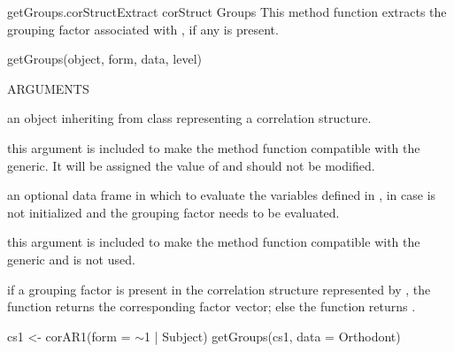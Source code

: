 \documentclass[pdftex]{article} \usepackage{url,graphicx}
\renewcommand{\Twiddle}{\mbox{\(\sim\)}}
\begin{document}
\begin{Helpfile}{getGroups.corStruct}{Extract corStruct Groups}
This method function extracts the grouping factor associated with
, if any is present.
\begin{Example}
getGroups(object, form, data, level)
\end{Example}
\begin{Argument}{ARGUMENTS}
\item[\Co{object:}]
an object inheriting from class 
representing a correlation structure.
\item[\Co{form:}]
this argument is included to make the method function
compatible with the generic. It will be assigned the value of
 and should not be modified.
\item[\Co{data:}]
an optional data frame in which to evaluate the variables
defined in , in case  is not initialized and
the grouping factor needs to be evaluated.
\item[\Co{level:}]
this argument is included to make the method function
compatible with the generic and is not used.
\end{Argument}
if a grouping factor is present in the correlation structure
represented by , the function returns the corresponding
factor vector; else the function returns .
\need 15pt
\vspace{-16pt} 
\begin{Example}
cs1 <- corAR1(form = \Twiddle 1 | Subject)
getGroups(cs1, data = Orthodont)
\end{Example}
\end{Helpfile}
\end{document}
